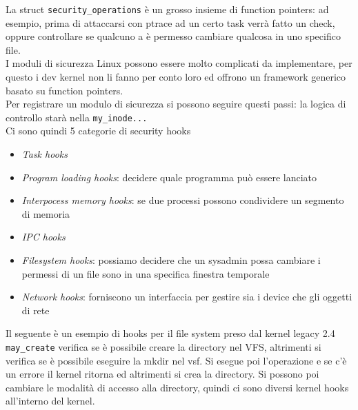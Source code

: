 \documentclass[12pt, oneside]{extbook} %
\begin{document}
La struct \texttt{security\_operations} è un grosso insieme di function pointers:
ad esempio, prima di attaccarsi con ptrace ad un certo task verrà fatto un check, oppure controllare se qualcuno a è permesso cambiare qualcosa in uno specifico file.\\I moduli di sicurezza Linux possono essere molto complicati da implementare, per questo i dev kernel non li fanno per conto loro ed offrono un framework generico basato su function pointers.\\Per registrare un modulo di sicurezza si possono seguire questi passi:
la logica di controllo starà nella \texttt{my\_inode...}\\Ci sono quindi 5 categorie di security hooks
\begin{itemize}
\item \textit{Task hooks}
\item \textit{Program loading hooks}: decidere quale programma può essere lanciato
\item \textit{Interpocess memory hooks}: se due processi possono condividere un segmento di memoria
\item \textit{IPC hooks}
\item \textit{Filesystem hooks}: possiamo decidere che un sysadmin possa cambiare i permessi di un file sono in una specifica finestra temporale
\item \textit{Network hooks}: forniscono un interfaccia per gestire sia i device che gli oggetti di rete
\end{itemize}
Il seguente è un esempio di hooks per il file system preso dal kernel legacy 2.4
\texttt{may\_create} verifica se è possibile creare la directory nel VFS, altrimenti si verifica se è possibile eseguire la mkdir nel vsf. Si esegue poi l'operazione e se c'è un errore il kernel ritorna ed altrimenti si crea la directory. Si possono poi cambiare le modalità di accesso alla directory, quindi ci sono diversi kernel hooks all'interno del kernel.
\end{document}
